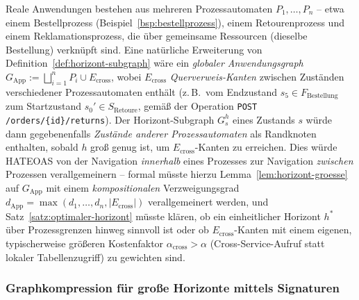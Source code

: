﻿\documentclass[a4paper,12pt]{article}
\theoremstyle{definition}
\begin{document}
Reale Anwendungen bestehen aus mehreren Prozessautomaten $P_1,\ldots,P_n$ -- etwa einem
Bestellprozess (Beispiel~\ref{bsp:bestellprozess}), einem Retourenprozess und einem
Reklamationsprozess, die über gemeinsame Ressourcen (dieselbe Bestellung) verknüpft sind.
Eine natürliche Erweiterung von Definition~\ref{def:horizont-subgraph} wäre ein
\emph{globaler Anwendungsgraph} $G_{\mathrm{App}} := \bigsqcup_{i=1}^n P_i \cup
E_{\mathrm{cross}}$, wobei $E_{\mathrm{cross}}$ \emph{Querverweis-Kanten} zwischen
Zuständen verschiedener Prozessautomaten enthält (z.\,B.\ vom Endzustand $s_5\in
F_{\text{Bestellung}}$ zum Startzustand $s_0'\in S_{\text{Retoure}}$, gemäß der Operation
\texttt{POST /orders/\{id\}/returns}). Der Horizont-Subgraph $G_s^h$ eines Zustands $s$
würde dann gegebenenfalls \emph{Zustände anderer Prozessautomaten} als Randknoten
enthalten, sobald $h$ groß genug ist, um $E_{\mathrm{cross}}$-Kanten zu erreichen. Dies
würde HATEOAS von der Navigation \emph{innerhalb} eines Prozesses zur Navigation
\emph{zwischen} Prozessen verallgemeinern -- formal müsste hierzu
Lemma~\ref{lem:horizont-groesse} auf $G_{\mathrm{App}}$ mit einem
\emph{kompositionalen} Verzweigungsgrad $d_{\mathrm{App}}=\max(d_1,\ldots,d_n,
|E_{\mathrm{cross}}|)$ verallgemeinert werden, und Satz~\ref{satz:optimaler-horizont}
müsste klären, ob ein einheitlicher Horizont $h^\ast$ über Prozessgrenzen hinweg
sinnvoll ist oder ob $E_{\mathrm{cross}}$-Kanten mit einem eigenen, typischerweise
größeren Kostenfaktor $\alpha_{\mathrm{cross}}>\alpha$ (Cross-Service-Aufruf statt
lokaler Tabellenzugriff) zu gewichten sind.

\subsubsection{Graphkompression für große Horizonte mittels Signaturen}
\end{document}
